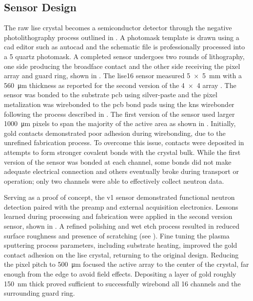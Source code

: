 \documentclass[../../../main.tex]{subfiles}%
\begin{document}
%
    \subsection{Sensor Design}%
    \label{sec:chapter-3:multi-channel-system:sensor-design}%
    The raw \gls{lise} crystal becomes a semiconductor detector through the negative photolithography process outlined in .
    A photomask template is drawn using a \gls{cad} editor such as \gls{autocad} and the schematic file is professionally processed into a \SI{5}{\inch} quartz photomask.
    A completed sensor undergoes two rounds of lithography, one side producing the broadface contact and the other side receiving the pixel array and guard ring, shown in .
    The \gls{lise16} sensor measured \SI{5x5}{\milli\meter} with a \SI{560}{\micro\meter} thickness as reported for the second version of the \num{4x4} array \cite{Herrera_2016}.
    The sensor was bonded to the substrate \gls{pcb} using \gls{silver-paste} and the pixel metalization was wirebonded to the \gls{pcb} bond pads using the \gls{kns} \gls{wirebonder} following the process described in .
    The first version of the sensor used larger \SI{1000}{\micro\meter} pixels to span the majority of the active area as shown in .
    Initially, gold contacts demonstrated poor adhesion during wirebonding, due to the unrefined fabrication process.
    To overcome this issue,  contacts were deposited in attempts to form stronger covalent bonds with the crystal bulk.
    While the first version of the sensor was bonded at each channel, some bonds did not make adequate electrical connection and others eventually broke during transport or operation; only two channels were able to effectively collect neutron data.
    \par%
    Serving as a proof of concept, the v1 sensor demonstrated functional neutron detection paired with the \gls{preamp} and external acquisition electronics.
    Lessons learned during processing and fabrication were applied in the second version sensor, shown in .
    A refined polishing and wet etch process resulted in reduced surface roughness and presence of scratching (see ).
    Fine tuning the plasma sputtering process parameters, including substrate heating, improved the gold contact adhesion on the \gls{lise} crystal, returning to the original design.
    Reducing the pixel pitch to \SI{500}{\micro\meter} focused the active array to the center of the crystal, far enough from the edge to avoid field effects.    
    Depositing a layer of gold roughly \SI{150}{\nano\meter} thick proved sufficient to successfully wirebond all 16 channels and the surrounding guard ring.
\end{document}
